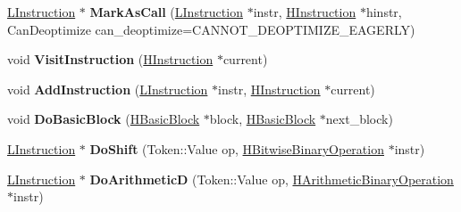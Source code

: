 \begin{DoxyCompactItemize}
\item 
\hyperlink{classv8_1_1internal_1_1_l_instruction}{L\+Instruction} $\ast$ {\bfseries Mark\+As\+Call} (\hyperlink{classv8_1_1internal_1_1_l_instruction}{L\+Instruction} $\ast$instr, \hyperlink{classv8_1_1internal_1_1_h_instruction}{H\+Instruction} $\ast$hinstr, Can\+Deoptimize can\+\_\+deoptimize=C\+A\+N\+N\+O\+T\+\_\+\+D\+E\+O\+P\+T\+I\+M\+I\+Z\+E\+\_\+\+E\+A\+G\+E\+R\+LY)\hypertarget{classv8_1_1internal_1_1_l_chunk_builder_af7d51aa993ccf0b54ae1599f1bc027d1}{}\label{classv8_1_1internal_1_1_l_chunk_builder_af7d51aa993ccf0b54ae1599f1bc027d1}

\item 
void {\bfseries Visit\+Instruction} (\hyperlink{classv8_1_1internal_1_1_h_instruction}{H\+Instruction} $\ast$current)\hypertarget{classv8_1_1internal_1_1_l_chunk_builder_a4da411e2e5777292cd23626bb87e5dc4}{}\label{classv8_1_1internal_1_1_l_chunk_builder_a4da411e2e5777292cd23626bb87e5dc4}

\item 
void {\bfseries Add\+Instruction} (\hyperlink{classv8_1_1internal_1_1_l_instruction}{L\+Instruction} $\ast$instr, \hyperlink{classv8_1_1internal_1_1_h_instruction}{H\+Instruction} $\ast$current)\hypertarget{classv8_1_1internal_1_1_l_chunk_builder_a834f4cd3c745234bc4ee8470490cfc89}{}\label{classv8_1_1internal_1_1_l_chunk_builder_a834f4cd3c745234bc4ee8470490cfc89}

\item 
void {\bfseries Do\+Basic\+Block} (\hyperlink{classv8_1_1internal_1_1_h_basic_block}{H\+Basic\+Block} $\ast$block, \hyperlink{classv8_1_1internal_1_1_h_basic_block}{H\+Basic\+Block} $\ast$next\+\_\+block)\hypertarget{classv8_1_1internal_1_1_l_chunk_builder_a0ba0ae4aeac5d0656366705f205680ed}{}\label{classv8_1_1internal_1_1_l_chunk_builder_a0ba0ae4aeac5d0656366705f205680ed}

\item 
\hyperlink{classv8_1_1internal_1_1_l_instruction}{L\+Instruction} $\ast$ {\bfseries Do\+Shift} (Token\+::\+Value op, \hyperlink{classv8_1_1internal_1_1_h_bitwise_binary_operation}{H\+Bitwise\+Binary\+Operation} $\ast$instr)\hypertarget{classv8_1_1internal_1_1_l_chunk_builder_a7fb98733b4fc4b83c5f63039c8bc249f}{}\label{classv8_1_1internal_1_1_l_chunk_builder_a7fb98733b4fc4b83c5f63039c8bc249f}

\item 
\hyperlink{classv8_1_1internal_1_1_l_instruction}{L\+Instruction} $\ast$ {\bfseries Do\+ArithmeticD} (Token\+::\+Value op, \hyperlink{classv8_1_1internal_1_1_h_arithmetic_binary_operation}{H\+Arithmetic\+Binary\+Operation} $\ast$instr)\hypertarget{classv8_1_1internal_1_1_l_chunk_builder_a9b447e818699e4928b4f769ae6b7ecbd}{}\label{classv8_1_1internal_1_1_l_chunk_builder_a9b447e818699e4928b4f769ae6b7ecbd}


\end{DoxyCompactItemize}

